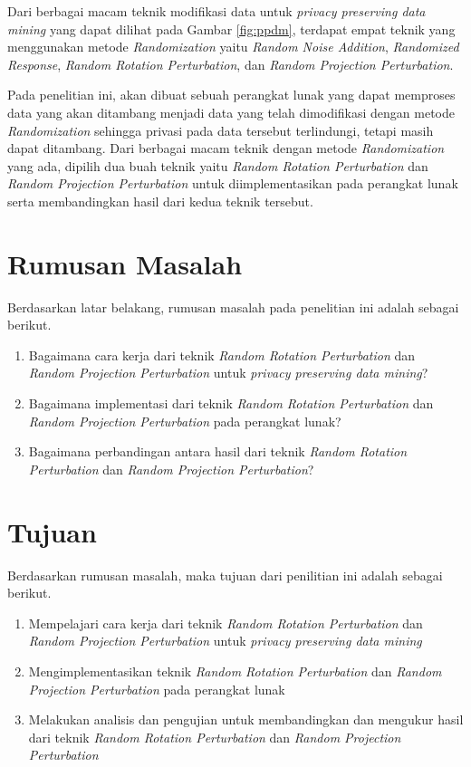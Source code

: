 \documentclass[a4paper,twoside]{article}
\begin{document}
Dari berbagai macam teknik modifikasi data untuk \textit{privacy preserving data mining} yang dapat dilihat pada Gambar \ref{fig:ppdm}, terdapat empat teknik yang menggunakan metode \textit{Randomization} yaitu \textit{Random Noise Addition}, \textit{Randomized Response}, \textit{Random Rotation Perturbation}, dan \textit{Random Projection Perturbation}.

Pada penelitian ini, akan dibuat sebuah perangkat lunak yang dapat memproses data yang akan ditambang menjadi data yang telah dimodifikasi dengan metode \textit{Randomization} sehingga privasi pada data tersebut terlindungi, tetapi masih dapat ditambang. Dari berbagai macam teknik dengan metode \textit{Randomization} yang ada, dipilih dua buah teknik yaitu \textit{Random Rotation Perturbation} dan \textit{Random Projection Perturbation} untuk diimplementasikan pada perangkat lunak serta membandingkan hasil dari kedua teknik tersebut.

\section{Rumusan Masalah}
Berdasarkan latar belakang, rumusan masalah pada penelitian ini adalah sebagai berikut.
\begin{enumerate}
	\item Bagaimana cara kerja dari teknik \textit{Random Rotation Perturbation} dan \textit{Random Projection Perturbation} untuk \textit{privacy preserving data mining}?
	\item Bagaimana implementasi dari teknik \textit{Random Rotation Perturbation} dan \textit{Random Projection Perturbation} pada perangkat lunak?
	\item Bagaimana perbandingan antara hasil dari teknik \textit{Random Rotation Perturbation} dan \textit{Random Projection Perturbation}?
\end{enumerate}

\section{Tujuan}
Berdasarkan rumusan masalah, maka tujuan dari penilitian ini adalah sebagai berikut.
\begin{enumerate}
	\item Mempelajari cara kerja dari teknik \textit{Random Rotation Perturbation} dan \textit{Random Projection Perturbation} untuk \textit{privacy preserving data mining}
	\item Mengimplementasikan teknik \textit{Random Rotation Perturbation} dan \textit{Random Projection Perturbation} pada perangkat lunak
	\item Melakukan analisis dan pengujian untuk membandingkan dan mengukur hasil dari teknik \textit{Random Rotation Perturbation} dan \textit{Random Projection Perturbation}
\end{enumerate}
\end{document}
